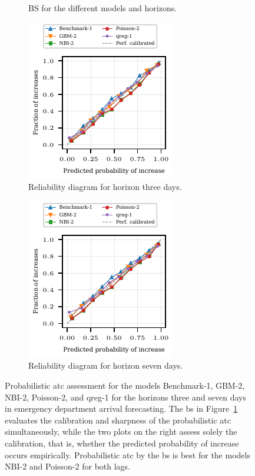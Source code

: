 \documentclass[pdflatex]{sn-jnl}
\theoremstyle{plain}%
\theoremstyle{definition}
\begin{document}
\begin{figure}
    \begin{subfigure}{0.32\textwidth}
    \tiny
    
    \caption{BS for the different models and horizons.}\label{fig:app-eda-prob-brier}
    \end{subfigure}\hspace{0.01\textwidth}%
    \begin{subfigure}[t]{0.32\textwidth}
    \includegraphics{plots/ed_arrival/60_reliability_diagram_lag_3}
    \caption{Reliability diagram for horizon three days.}\label{fig:app-eda-prob-rel-3}
    \end{subfigure}\hspace{0.01\textwidth}%
    \begin{subfigure}[t]{0.32\textwidth}
    \includegraphics{plots/ed_arrival/60_reliability_diagram_lag_7}
    \caption{Reliability diagram for horizon seven days.}\label{fig:app-eda-prob-rel-7}
    \end{subfigure}
    \caption[Probabilistic \ac{atc} assessment in emergency department arrival forecasting.]{Probabilistic \ac{atc} assessment for the models Benchmark-1, GBM-2, NBI-2, Poisson-2, and qreg-1 for the horizons three and seven days in emergency department arrival forecasting. The \acl{bs} in Figure~\ref{fig:app-eda-prob-brier} evaluates the calibration and sharpness of the probabilistic \ac{atc} simultaneously, while the two plots on the right assess solely the calibration, that is, whether the predicted probability of increase occurs empirically. Probabilistic \ac{atc} by the \ac{bs} is best for the models NBI-2 and Poisson-2 for both lags.}
    \label{fig:app-eda-prob}
\end{figure}
\end{document}
